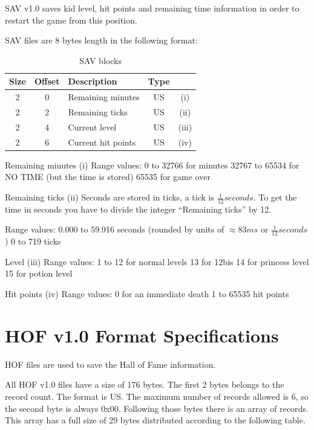 \documentclass{article}
\begin{document}
 SAV v1.0 saves kid level, hit points and remaining time information in
 order to restart the game from this position.

 SAV files are 8 bytes length in the following format:

\begin{table}
\begin{tabular}{cclcc}
\hline
   Size& Offset& Description                 & Type \\
\hline
      2     & 0& Remaining minutes           & US  & (i) \\
      2     & 2& Remaining ticks             & US  & (ii) \\
      2     & 4& Current level               & US  & (iii) \\
      2     & 6& Current hit points          & US  & (iv) \\
\hline
\end{tabular}
\caption{SAV blocks}
\label{palettes table}
\end{table}

 Remaining minutes (i)
  Range values:
   0     to 32766 for minutes
   32767 to 65534 for NO TIME (but the time is stored)
   65535 for game over

 Remaining ticks (ii)
  Seconds are stored in ticks, a tick is $\frac{1}{12} seconds$. To get the time in
  seconds you have to divide the integer ``Remaining ticks'' by 12.

  Range values:
   0.000 to 59.916 seconds
                   (rounded by units of $\approx 83 ms$ or $\frac{1}{12} seconds$)
   0     to 719    ticks

 Level (iii)
  Range values:
   1  to 12 for normal levels
   13 for 12bis
   14 for princess level
   15 for potion level

 Hit points (iv)
  Range values:
   0 for an immediate death
   1 to 65535 hit points


\section{HOF v1.0 Format Specifications}

 HOF files are used to save the Hall of Fame information.

 All HOF v1.0 files have a size of 176 bytes. The first 2 bytes belongs to
 the record count. The format is US. The maximum number of records allowed
 is 6, so the second byte is always 0x00.
 Following those bytes there is an array of records. This array has a full
 size of 29 bytes distributed according to the following table.
\end{document}
